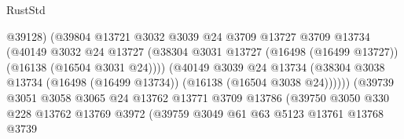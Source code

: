 \begin{lexlean}{RustStd}
\begin{coremodule}
                                          @39128)
                                        (@39804
                                          @13721
                                          @3032
                                          @3039
                                          @24
                                          @3709
                                          @13727
                                          @3709
                                          @13734
                                          (@40149
                                            @3032
                                            @24
                                            @13727
                                            (@38304
                                              @3031
                                              @13727
                                              (@16498 (@16499 @13727))
                                              (@16138 (@16504 @3031 @24))))
                                          (@40149
                                            @3039
                                            @24
                                            @13734
                                            (@38304
                                              @3038
                                              @13734
                                              (@16498 (@16499 @13734))
                                              (@16138 (@16504 @3038 @24))))))
                                      (@39739
                                        @3051
                                        @3058
                                        @3065
                                        @24
                                        @13762
                                        @13771
                                        @3709
                                        @13786
                                        (@39750
                                          @3050
                                          @330
                                          @228
                                          @13762
                                          @13769
                                          @3972
                                          (@39759
                                            @3049
                                            @61
                                            @63
                                            @5123
                                            @13761
                                            @13768
                                            @3739

\end{coremodule}
\end{lexlean}
